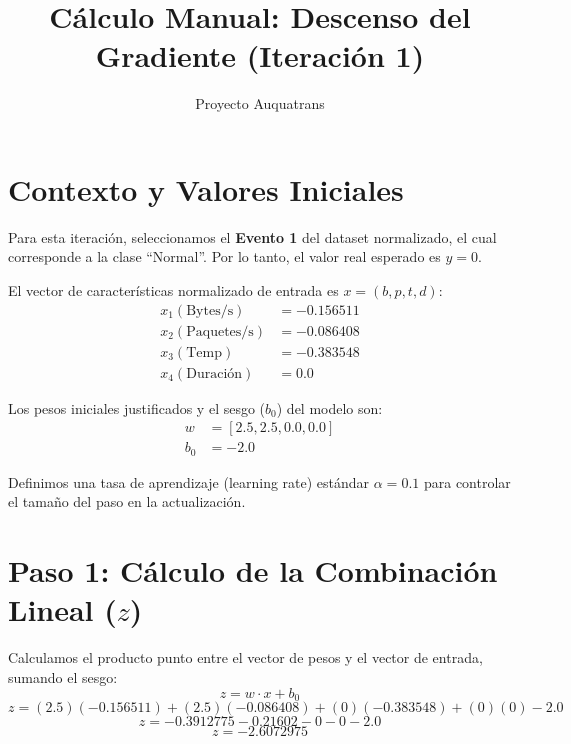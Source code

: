 \documentclass{article}
\title{Cálculo Manual: Descenso del Gradiente (Iteración 1)}
\author{Proyecto Auquatrans}
\date{}
\begin{document}
\maketitle

\section*{Contexto y Valores Iniciales}
Para esta iteración, seleccionamos el \textbf{Evento 1} del dataset normalizado, el cual corresponde a la clase ``Normal''. Por lo tanto, el valor real esperado es $y = 0$.

El vector de características normalizado de entrada es $x = (b, p, t, d)$:
\begin{align*}
    x_1 (\text{Bytes/s}) &= -0.156511 \\
    x_2 (\text{Paquetes/s}) &= -0.086408 \\
    x_3 (\text{Temp}) &= -0.383548 \\
    x_4 (\text{Duración}) &= 0.0
\end{align*}

Los pesos iniciales justificados y el sesgo ($b_0$) del modelo son:
\begin{align*}
    w &= [2.5, 2.5, 0.0, 0.0] \\
    b_0 &= -2.0
\end{align*}

Definimos una tasa de aprendizaje (learning rate) estándar $\alpha = 0.1$ para controlar el tamaño del paso en la actualización.

\section*{Paso 1: Cálculo de la Combinación Lineal ($z$)}
Calculamos el producto punto entre el vector de pesos y el vector de entrada, sumando el sesgo:
\begin{equation}
    z = w \cdot x + b_0
\end{equation}
\begin{equation*}
    z = (2.5)(-0.156511) + (2.5)(-0.086408) + (0)(-0.383548) + (0)(0) - 2.0
\end{equation*}
\begin{equation*}
    z = -0.3912775 - 0.21602 - 0 - 0 - 2.0
\end{equation*}
\begin{equation*}
    z = -2.6072975
\end{equation*}
\end{document}
